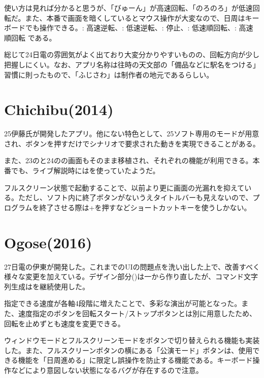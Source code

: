 \documentclass[letterpaper,10pt,dvipdfmx]{sphinxmanual}
\begin{document}
使い方は見れば分かると思うが、「びゅーん」が高速回転、「のろのろ」が低速回転だ。また、本番で画面を暗くしているとマウス操作が大変なので、日周はキーボードでも操作できる。: 高速逆転、: 低速逆転、: 停止、: 低速順回転、: 高速順回転 である。

総じて24日電の雰囲気がよく出ており大変分かりやすいものの、回転方向が少し把握しにくい。なお、アプリ名称は往時の天文部の「備品などに駅名をつける」習慣に則ったもので、「ふじさわ」は制作者の地元であるらしい。


\section{Chichibu(2014)}
\label{\detokenize{nissyu-idohen/pc-software-history:chichibu-2014}}

25伊藤氏が開発したアプリ。他にない特色として、25ソフト専用のモードが用意され、ボタンを押すだけでシナリオで要求された動きを実現できることがある。

また、23のと24のの画面もそのまま移植され、それぞれの機能が利用できる。本番でも、ライブ解説時にはを使っていたようだ。


フルスクリーン状態で起動することで、以前より更に画面の光漏れを抑えている。ただし、ソフト内に終了ボタンがないうえタイトルバーも見えないので、プログラムを終了させる際は+を押すなどショートカットキーを使うしかない。


\section{Ogose(2016)}
\label{\detokenize{nissyu-idohen/pc-software-history:ogose-2016}}

27日電の伊東が開発した。これまでのUIの問題点を洗い出した上で、改善すべく様々な変更を加えている。デザイン部分()は一から作り直したが、コマンド文字列生成はを継続使用した。

指定できる速度が各軸4段階に増えたことで、多彩な演出が可能となった。また、速度指定のボタンを回転スタート/ストップボタンとは別に用意したため、回転を止めずとも速度を変更できる。

ウィンドウモードとフルスクリーンモードをボタンで切り替えられる機能も実装した。また、フルスクリーンボタンの横にある「公演モード」ボタンは、使用できる機能を「日周進める」に限定し誤操作を防止する機能である。キーボード操作などにより意図しない状態になるバグが存在するので注意。
\end{document}
